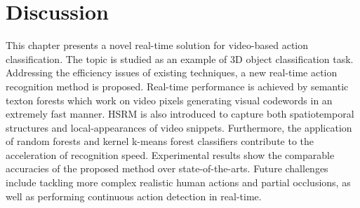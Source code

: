 \section{Discussion}
\label{sec/act/discussion}
This chapter presents a novel real-time solution for video-based action classification. 
The topic is studied as an example of 3D object classification task. 
Addressing the efficiency issues of existing techniques, a new real-time action recognition method is proposed. 
Real-time performance is achieved by semantic texton forests which work on video pixels generating visual codewords in an extremely fast manner. HSRM is also introduced to capture both spatiotemporal structures and local-appearances of video snippets. 
Furthermore, the application of random forests and kernel k-means forest classifiers contribute to the acceleration of recognition speed. 
Experimental results show the comparable accuracies of the proposed method over state-of-the-arts. Future challenges include tackling more complex realistic human actions and partial occlusions, as well as performing continuous action detection in real-time.
